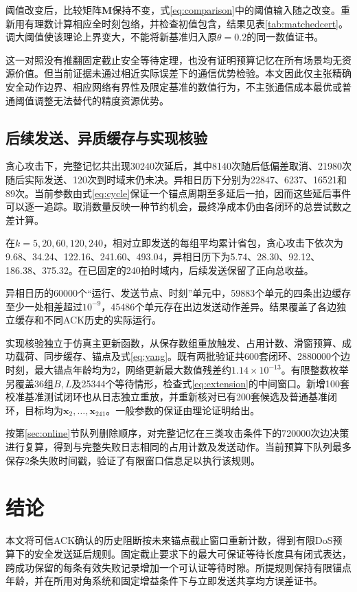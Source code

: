 \documentclass[UTF8,a4paper,zihao=5,fontset=windows]{ctexart}
\begin{document}
阈值改变后，比较矩阵${\bm{M}}$保持不变，式\eqref{eq:comparison}中的阈值输入随之改变。重新用有理数计算相应全时刻包络，并检查初值包含，结果见表\ref{tab:matchedcert}。调大阈值使该理论上界变大，不能将新基准归入原$\theta=0.2$的同一数值证书。


这一对照没有推翻固定截止安全等待定理，也没有证明预算记忆在所有场景均无资源价值。但当前证据未通过相近实际误差下的通信优势检验。本文因此仅主张精确安全动作边界、相应网络有界性及限定基准的数值行为，不主张通信成本最优或普通阈值调整无法替代的精度资源优势。

\subsection{后续发送、异质缓存与实现核验}
贪心攻击下，完整记忆共出现30240次延后，其中8140次随后低偏差取消、21980次随后实际发送、120次到时域末仍未决。异相日历下分别为22847、6237、16521和89次。当前参数由式\eqref{eq:cycle}保证一个锚点周期至多延后一拍，因而这些延后事件可以逐一追踪。取消数量反映一种节约机会，最终净成本仍由各闭环的总尝试数之差计算。

在$k=5,20,60,120,240$，相对立即发送的每组平均累计省包，贪心攻击下依次为9.68、34.24、122.16、241.60、493.04，异相日历下为5.74、28.30、92.12、186.38、375.32。在已固定的240拍时域内，后续发送保留了正向总收益。

异相日历的60000个“运行、发送节点、时刻”单元中，59883个单元的四条出边缓存至少一处相差超过$10^{-9}$，45486个单元存在出边发送动作差异。结果覆盖了各边独立缓存和不同ACK历史的实际运行。

实现核验独立于仿真主更新函数，从保存数组重放触发、占用计数、滑窗预算、成功载荷、同步缓存、锚点及式\eqref{eq:yang}。既有两批验证共600套闭环、2880000个边时刻，最大锚点年龄均为2，网络更新最大数值残差约$1.14\times10^{-13}$。有限整数枚举另覆盖36组$B,L$及25344个等待情形，检查式\eqref{eq:extension}的中间窗口。新增100套校准基准测试闭环也从日志独立重放，并重新核对已有200套候选及普通基准闭环，目标均为${\bm{x}}_2,\ldots,{\bm{x}}_{241}$。一般参数的保证由理论证明给出。

按第\ref{sec:online}节队列删除顺序，对完整记忆在三类攻击条件下的720000次边决策进行复算，得到与完整失败日志相同的占用计数及发送动作。当前预算下队列最多保存2条失败时间戳，验证了有限窗口信息足以执行该规则。

\section{结论}
本文将可信ACK确认的历史阻断按未来锚点截止窗口重新计数，得到有限DoS预算下的安全发送延后规则。固定截止要求下的最大可保证等待长度具有闭式表达，跨成功保留的每条有效失败记录增加一个可认证等待时隙。所提规则保持有限锚点年龄，并在所用对角系统和固定增益条件下与立即发送共享均方误差证书。
\end{document}
